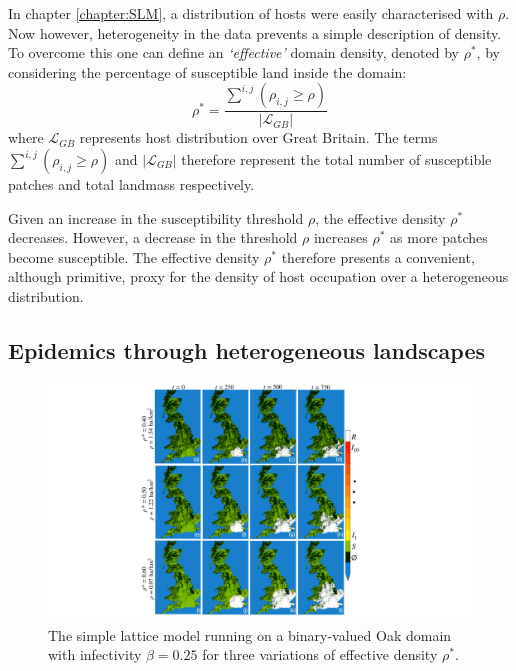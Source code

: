In chapter \ref{chapter:SLM}, a distribution of hosts were easily characterised with $\rho$. %
Now however, heterogeneity in the data prevents a simple description of density. %
To overcome this one can define an \textit{`effective'} domain density, denoted by $\rho^*$,  by considering the percentage of susceptible land inside the domain:
\begin{equation}
    \label{eq:rho_eff}
  \rho^{*} = \frac{\sum^{i, j} ( \rho_{i,j} \geq \rho )}{|\mathcal{L}_{GB}|}
\end{equation}
where $\mathcal{L}_{GB}$ represents host distribution over Great Britain. %
 The terms $\sum^{i, j} (\rho_{i,j} \geq \rho)$ and $|\mathcal{L}_{GB}|$ therefore represent %
 the total number of susceptible patches and total landmass respectively. %

Given an increase in the susceptibility threshold $\rho$, the %
 effective density $\rho^*$ decreases. %
However, a  decrease in the threshold $\rho$ increases $\rho^*$ as more patches become susceptible. %
The effective density $\rho^{*}$ therefore presents a convenient, although primitive, proxy %
for the density of host occupation over a heterogeneous distribution. %

\subsection{Epidemics through heterogeneous landscapes}
\begin{figure}
    \centering
    \includegraphics[scale=0.490]{chapter4/figures/figure4.pdf}
    \caption{The simple lattice model running on a binary-valued Oak domain with infectivity $\beta=0.25$ for three variations of effective density $\rho^*$.}
    \label{fig:ch4_uk_spread}
\end{figure}

